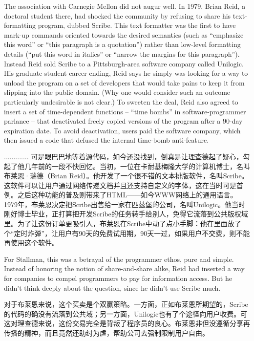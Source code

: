 \ifdefined\eng
The association with Carnegie Mellon did not augur well. In 1979, Brian Reid, a doctoral student there, had shocked the community by refusing to share his text-formatting program, dubbed Scribe.  This text formatter was the first to have mark-up commands oriented towards the desired semantics (such as ``emphasize this word'' or ``this paragraph is a quotation'') rather than low-level formatting details (``put this word in italics'' or ``narrow the margins for this paragraph''). Instead Reid sold Scribe to a Pittsburgh-area software company called Unilogic. His graduate-student career ending, Reid says he simply was looking for a way to unload the program on a set of developers that would take pains to keep it from slipping into the public domain.  (Why one would consider such an outcome particularly undesirable is not clear.) To sweeten the deal, Reid also agreed to insert a set of time-dependent functions -- ``time bombs'' in software-programmer parlance -- that deactivated freely copied versions of the program after a 90-day expiration date. To avoid deactivation, users paid the software company, which then issued a code that defused the internal time-bomb anti-feature.
\fi

\ifdefined\chs
.............
可是眼巴巴地等着源代码，如今还没找到，倒真是让理查德起了疑心，勾起了他几年前的一段不快回忆。当初，一位在卡耐基梅隆大学的计算机博士，名叫布莱恩·瑞德（Brian Reid）。他开发了一个很不错的文本排版软件，名叫Scribe。这软件可以让用户通过网络传递文档并且还支持自定义的字体，这在当时可是首例。之后这种功能的普及则带来了HTML——如今WWW网络上的通用语言。1979年，布莱恩决定把Scribe出售给一家在匹兹堡的公司，名叫Unilogic。他当时刚好博士毕业，正打算把开发Scribe的任务转手给别人，免得它流落到公共版权域里。为了让这份订单更吸引人，布莱恩在Scribe中动了点小手脚：他在里面放了个“定时炸弹”，让用户有90天的免费试用期，90天一过，如果用户不交费，则不能再使用这个软件。
\fi

\ifdefined\eng
For Stallman, this was a betrayal of the programmer ethos, pure and simple. Instead of honoring the notion of share-and-share alike, Reid had inserted a way for companies to compel programmers to pay for information access.  But he didn't think deeply about the question, since he didn't use Scribe much.
\fi

\ifdefined\chs
对于布莱恩来说，这个买卖是个双赢策略。一方面，正如布莱恩所期望的，Scribe的代码的确没有流落到公共域；另一方面，Unilogic也有了个途径向用户收费。可这对理查德来说，这份交易完全是背叛了程序员的良心。布莱恩非但没遵循分享再传播的精神，而且竟然还助纣为虐，帮助公司去强制限制用户自由。
\fi

